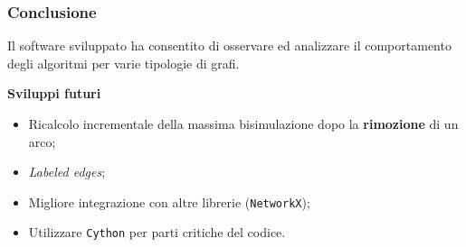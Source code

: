 \documentclass{beamer}
\begin{document}
\begin{frame}\frametitle{Conclusione}
    Il software sviluppato ha consentito di osservare ed analizzare il comportamento degli algoritmi per varie tipologie di grafi.

    \bigskip\bigskip

    \textbf{Sviluppi futuri}
    \begin{itemize}
        \item Ricalcolo incrementale della massima bisimulazione dopo la \textbf{rimozione} di un arco;
        \item \emph{Labeled edges};
        \item Migliore integrazione con altre librerie (\texttt{NetworkX});
        \item Utilizzare \texttt{Cython} per parti critiche del codice.
    \end{itemize}
\end{frame}
\end{document}
